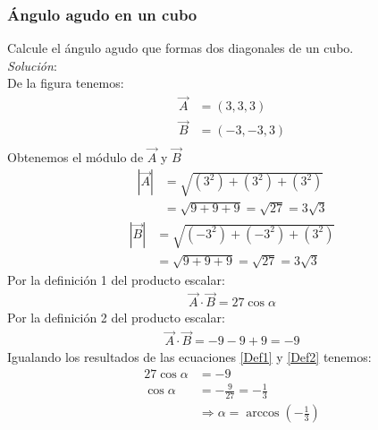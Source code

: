 \documentclass[12pt,openany]{book}
\begin{document}
			\subsubsection{\'Angulo agudo en un cubo}
				Calcule el \'angulo agudo que formas dos diagonales de un cubo.\\
				\noindent\textsl{Soluci\'on}:\\
				De la figura tenemos:
				\begin{equation*}
					\begin{split}
						\vec{A}&=(3,3,3)\\
						\vec{B}&=(-3,-3,3)\\
					\end{split}
				\end{equation*}
				Obtenemos el m\'odulo de $\vec{A}$ y $\vec{B}$
				\begin{equation*}
					\begin{split}
						|\vec{A}|&=\sqrt{(3^{2})+(3^{2})+(3^{2})}\\
											&=\sqrt{9+9+9}=\sqrt{27}=3\sqrt{3}					
					\end{split}
				\end{equation*}
				\begin{equation*}
					\begin{split}
						|\vec{B}|&=\sqrt{(-3^{2})+(-3^{2})+(3^{2})}\\
											&=\sqrt{9+9+9}=\sqrt{27}=3\sqrt{3}					
					\end{split}
				\end{equation*}
				Por la definici\'on 1 del producto escalar:
				\begin{equation}
					\begin{split}
						\vec{A}\cdot\vec{B}=27\cos\alpha					
					\end{split}
					\label{Def1}
				\end{equation}
				Por la definici\'on 2 del producto escalar:
				\begin{equation}
					\begin{split}
						\vec{A}\cdot\vec{B}=-9-9+9=-9					
					\end{split}
					\label{Def2}
				\end{equation}
				Igualando los resultados de las ecuaciones \ref{Def1} y \ref{Def2} tenemos:
				\begin{equation*}
					\begin{split}
						27\cos\alpha&=-9\\
						\cos\alpha&=-\frac{9}{27}=-\frac{1}{3}\\
						&\Rightarrow \alpha=\arccos(-\frac{1}{3})
					\end{split}
				\end{equation*}
\end{document}
